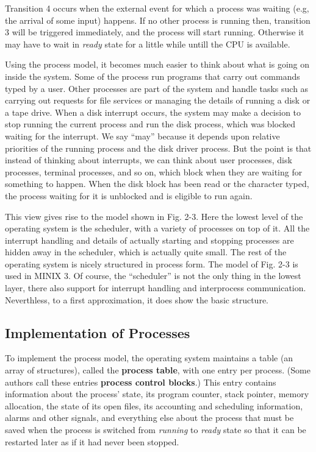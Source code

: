 \documentclass{book}
\newcommand {\kw}  [1] {\textbf{#1}}
\newcommand {\sys} [1] {\textsl{#1}}
\begin{document}
Transition 4 occurs when the external event for which a process was waiting (e.g, the arrival of some input) happens.
If no other process is running then, transition 3 will be triggered immediately,
and the process will start running.
Otherwise it may have to wait in \sys{ready} state for a little while untill the CPU is available.

Using the process model, it becomes much easier to think about what is going on inside the system.
Some of the process run programs that carry out commands typed by a user.
Other processes are part of the system and handle tasks such as carrying out requests for file services 
or managing the details of running a disk or a tape drive.
When a disk interrupt occurs, the system may make a decision to stop running the current process and run the disk process,
which was blocked waiting for the interrupt.
We say ``may'' because it depends upon relative priorities of the running process and the disk driver process.
But the point is that instead of thinking about interrupts, we can think about user processes, disk processes, terminal processes, and so on,
which block when they are waiting for something to happen.
When the disk block has been read or the character typed, the process waiting for it is unblocked
and is eligible to run again.

This view gives rise to the model shown in Fig. 2-3.
Here the lowest level of the operating system is the scheduler, with a variety of processes on top of it.
All the interrupt handling and details of actually starting and stopping processes are hidden away in the scheduler,
which is actually quite small.
The rest of the operating system is nicely structured in process form.
The model of Fig. 2-3 is used in MINIX 3.
Of course, the ``scheduler'' is not the only thing in the lowest layer, 
there also support for interrupt handling and interprocess communication.
Neverthless, to a first approximation, it does show the basic structure.

\subsection{Implementation of Processes}
To implement the process model, the operating system maintains a table (an array of structures),
called the \kw{process table}, with one entry per process.
(Some authors call these entries \kw{process control blocks}.)
This entry contains information about the process' state, its program counter, stack pointer, memory allocation,
the state of its open files, its accounting and scheduling information, alarms and other signals,
and everything else about the process that must be saved when the process is switched from \sys{running} to \sys{ready} state 
so that it can be restarted later as if it had never been stopped.
\end{document}
